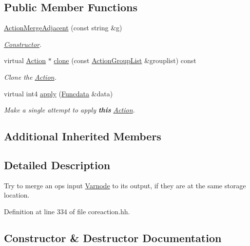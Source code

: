 \subsection*{Public Member Functions}
\begin{DoxyCompactItemize}
\item 
\mbox{\hyperlink{class_action_merge_adjacent_aabe5af8fc50c733dcdd0eace662ee1e2}{Action\+Merge\+Adjacent}} (const string \&g)
\begin{DoxyCompactList}\small\item\em \mbox{\hyperlink{class_constructor}{Constructor}}. \end{DoxyCompactList}\item 
virtual \mbox{\hyperlink{class_action}{Action}} $\ast$ \mbox{\hyperlink{class_action_merge_adjacent_af7ddb17ea086b27efa6461076a258c54}{clone}} (const \mbox{\hyperlink{class_action_group_list}{Action\+Group\+List}} \&grouplist) const
\begin{DoxyCompactList}\small\item\em Clone the \mbox{\hyperlink{class_action}{Action}}. \end{DoxyCompactList}\item 
virtual int4 \mbox{\hyperlink{class_action_merge_adjacent_aa6319f917bac228ae065205c84efb5e1}{apply}} (\mbox{\hyperlink{class_funcdata}{Funcdata}} \&data)
\begin{DoxyCompactList}\small\item\em Make a single attempt to apply {\bfseries{this}} \mbox{\hyperlink{class_action}{Action}}. \end{DoxyCompactList}\end{DoxyCompactItemize}
\subsection*{Additional Inherited Members}


\subsection{Detailed Description}
Try to merge an op\textquotesingle{}s input \mbox{\hyperlink{class_varnode}{Varnode}} to its output, if they are at the same storage location. 

Definition at line 334 of file coreaction.\+hh.



\subsection{Constructor \& Destructor Documentation}
\mbox{\label{class_action_merge_adjacent_aabe5af8fc50c733dcdd0eace662ee1e2}} 
